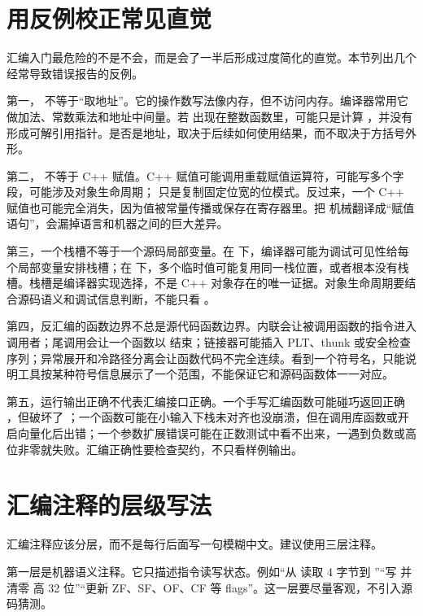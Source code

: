 \section{用反例校正常见直觉}

汇编入门最危险的不是不会，而是会了一半后形成过度简化的直觉。本节列出几个经常导致错误报告的反例。

第一， 不等于“取地址”。它的操作数写法像内存，但不访问内存。编译器常用它做加法、常数乘法和地址中间量。若  出现在整数函数里，可能只是计算 ，并没有形成可解引用指针。是否是地址，取决于后续如何使用结果，而不取决于方括号外形。

第二， 不等于 C++ 赋值。C++ 赋值可能调用重载赋值运算符，可能写多个字段，可能涉及对象生命周期； 只是复制固定位宽的位模式。反过来，一个 C++ 赋值也可能完全消失，因为值被常量传播或保存在寄存器里。把  机械翻译成“赋值语句”，会漏掉语言和机器之间的巨大差异。

第三，一个栈槽不等于一个源码局部变量。在  下，编译器可能为调试可见性给每个局部变量安排栈槽；在  下，多个临时值可能复用同一栈位置，或者根本没有栈槽。栈槽是编译器实现选择，不是 C++ 对象存在的唯一证据。对象生命周期要结合源码语义和调试信息判断，不能只看 \code{[rbp - 4]}。

第四，反汇编的函数边界不总是源代码函数边界。内联会让被调用函数的指令进入调用者；尾调用会让一个函数以  结束；链接器可能插入 PLT、thunk 或安全检查序列；异常展开和冷路径分离会让函数代码不完全连续。看到一个符号名，只能说明工具按某种符号信息展示了一个范围，不能保证它和源码函数体一一对应。

第五，运行输出正确不代表汇编接口正确。一个手写汇编函数可能碰巧返回正确 ，但破坏了 ；一个函数可能在小输入下栈未对齐也没崩溃，但在调用库函数或开启向量化后出错；一个参数扩展错误可能在正数测试中看不出来，一遇到负数或高位非零就失败。汇编正确性要检查契约，不只看样例输出。

\section{汇编注释的层级写法}

汇编注释应该分层，而不是每行后面写一句模糊中文。建议使用三层注释。

第一层是机器语义注释。它只描述指令读写状态。例如“从  读取 4 字节到 ”“写  并清零  高 32 位”“更新 ZF、SF、OF、CF 等 flags”。这一层要尽量客观，不引入源码猜测。

